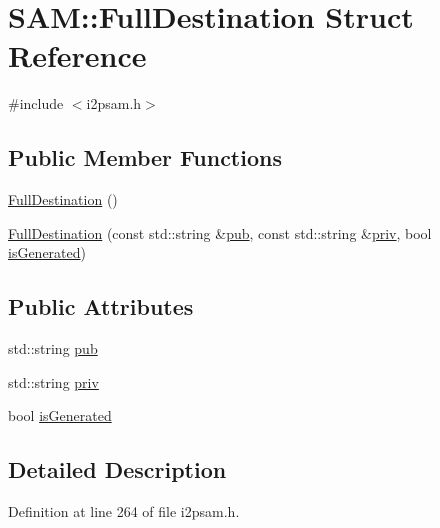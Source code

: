 \hypertarget{struct_s_a_m_1_1_full_destination}{}\section{S\+A\+M\+:\+:Full\+Destination Struct Reference}
\label{struct_s_a_m_1_1_full_destination}


{\ttfamily \#include $<$i2psam.\+h$>$}

\subsection*{Public Member Functions}
\begin{DoxyCompactItemize}
\item 
\hyperlink{struct_s_a_m_1_1_full_destination_ae015fe38cbe9705e184bfdb989754a0d}{Full\+Destination} ()
\item 
\hyperlink{struct_s_a_m_1_1_full_destination_a34bd2c30ece2ab9ef5da2ff250a47135}{Full\+Destination} (const std\+::string \&\hyperlink{struct_s_a_m_1_1_full_destination_abd0be9a7b3b430ca750f1e876f2d6b4b}{pub}, const std\+::string \&\hyperlink{struct_s_a_m_1_1_full_destination_a9ce0281e2f9cd55dcfc773c7fbd09f0f}{priv}, bool \hyperlink{struct_s_a_m_1_1_full_destination_a1331a1c5cc053781fa127c0c23bb7b9b}{is\+Generated})
\end{DoxyCompactItemize}
\subsection*{Public Attributes}
\begin{DoxyCompactItemize}
\item 
std\+::string \hyperlink{struct_s_a_m_1_1_full_destination_abd0be9a7b3b430ca750f1e876f2d6b4b}{pub}
\item 
std\+::string \hyperlink{struct_s_a_m_1_1_full_destination_a9ce0281e2f9cd55dcfc773c7fbd09f0f}{priv}
\item 
bool \hyperlink{struct_s_a_m_1_1_full_destination_a1331a1c5cc053781fa127c0c23bb7b9b}{is\+Generated}
\end{DoxyCompactItemize}


\subsection{Detailed Description}


Definition at line 264 of file i2psam.\+h.



